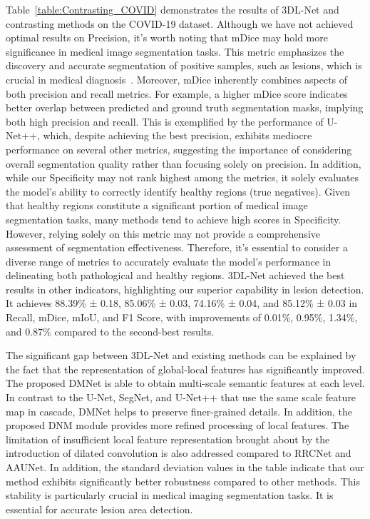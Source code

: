 \documentclass[review]{elsarticle}
\begin{document}
		Table~\ref{table:Contrasting_COVID} demonstrates the results of 3DL-Net and contrasting methods on the COVID-19 dataset. Although we have not achieved optimal results on Precision, it's worth noting that mDice may hold more significance in medical image segmentation tasks. This metric emphasizes the discovery and accurate segmentation of positive samples, such as lesions, which is crucial in medical diagnosis~\cite{milletari2016v}. Moreover, mDice inherently combines aspects of both precision and recall metrics. For example, a higher mDice score indicates better overlap between predicted and ground truth segmentation masks, implying both high precision and recall. This is exemplified by the performance of U-Net++, which, despite achieving the best precision, exhibits mediocre performance on several other metrics, suggesting the importance of considering overall segmentation quality rather than focusing solely on precision. In addition, while our Specificity may not rank highest among the metrics, it solely evaluates the model's ability to correctly identify healthy regions (true negatives). Given that healthy regions constitute a significant portion of medical image segmentation tasks, many methods tend to achieve high scores in Specificity. However, relying solely on this metric may not provide a comprehensive assessment of segmentation effectiveness. Therefore, it's essential to consider a diverse range of metrics to accurately evaluate the model's performance in delineating both pathological and healthy regions.
		3DL-Net achieved the best results in other indicators, highlighting our superior capability in lesion detection. It achieves 88.39\% ± 0.18, 85.06\% ± 0.03, 74.16\% ± 0.04, and 85.12\% ± 0.03 in Recall, mDice, mIoU, and F1 Score, with improvements of 0.01\%, 0.95\%, 1.34\%, and 0.87\% compared to the second-best results.
		
		The significant gap between 3DL-Net and existing methods can be explained by the fact that the representation of global-local features has significantly improved. The proposed DMNet is able to obtain multi-scale semantic features at each level. In contrast to the U-Net, SegNet, and U-Net++ that use the same scale feature map in cascade, DMNet helps to preserve finer-grained details. In addition, the proposed DNM module provides more refined processing of local features. The limitation of insufficient local feature representation brought about by the introduction of dilated convolution is also addressed compared to RRCNet and AAUNet. In addition, the standard deviation values in the table indicate that our method exhibits significantly better robustness compared to other methods. This stability is particularly crucial in medical imaging segmentation tasks. It is essential for accurate lesion area detection.
	
\end{document}
